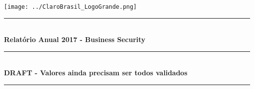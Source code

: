 \begin{titlepage}
\thispagestyle{fancy}

\newcommand{\HRule}{\rule{\linewidth}{0.5mm}} %

\center %



\texttt{[image: ../ClaroBrasil\_LogoGrande.png]}\\[1cm] %




\HRule \\[0.4cm]
{ \huge \bfseries Relatório Anual 2017 - Business Security}\\[0.4cm]
\HRule \\[1.5cm]

{\bfseries DRAFT - Valores ainda precisam ser todos validados}\\[0.4cm]
\HRule \\[1.5cm]
 
 



\end{titlepage}
